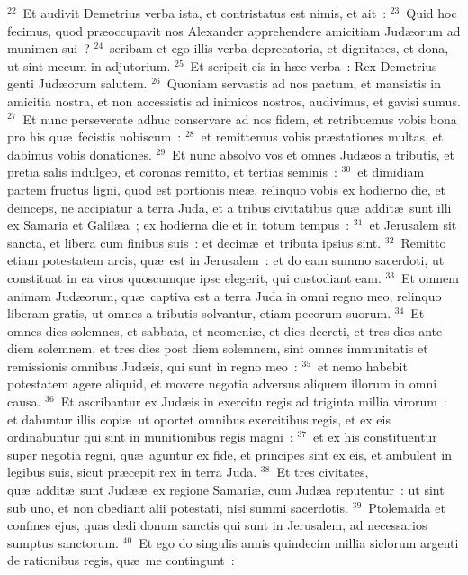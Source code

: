 ${}^{22}$~Et audivit Demetrius verba ista, et contristatus est nimis, et ait~:
${}^{23}$~Quid hoc fecimus, quod pr\ae occupavit nos Alexander apprehendere amicitiam Jud\ae orum ad munimen sui~?
${}^{24}$~scribam et ego illis verba deprecatoria, et dignitates, et dona, ut sint mecum in adjutorium.
${}^{25}$~Et scripsit eis in h\ae c verba~: Rex Demetrius genti Jud\ae orum salutem.
${}^{26}$~Quoniam servastis ad nos pactum, et mansistis in amicitia nostra, et non accessistis ad inimicos nostros, audivimus, et gavisi sumus.
${}^{27}$~Et nunc perseverate adhuc conservare ad nos fidem, et retribuemus vobis bona pro his qu\ae\ fecistis nobiscum~:
${}^{28}$~et remittemus vobis pr\ae stationes multas, et dabimus vobis donationes.
${}^{29}$~Et nunc absolvo vos et omnes Jud\ae os a tributis, et pretia salis indulgeo, et coronas remitto, et tertias seminis~:
${}^{30}$~et dimidiam partem fructus ligni, quod est portionis me\ae , relinquo vobis ex hodierno die, et deinceps, ne accipiatur a terra Juda, et a tribus civitatibus qu\ae\ addit\ae\ sunt illi ex Samaria et Galil\ae a~; ex hodierna die et in totum tempus~:
${}^{31}$~et Jerusalem sit sancta, et libera cum finibus suis~: et decim\ae\ et tributa ipsius sint.
${}^{32}$~Remitto etiam potestatem arcis, qu\ae\ est in Jerusalem~: et do eam summo sacerdoti, ut constituat in ea viros quoscumque ipse elegerit, qui custodiant eam.
${}^{33}$~Et omnem animam Jud\ae orum, qu\ae\ captiva est a terra Juda in omni regno meo, relinquo liberam gratis, ut omnes a tributis solvantur, etiam pecorum suorum.
${}^{34}$~Et omnes dies solemnes, et sabbata, et neomeni\ae , et dies decreti, et tres dies ante diem solemnem, et tres dies post diem solemnem, sint omnes immunitatis et remissionis omnibus Jud\ae is, qui sunt in regno meo~:
${}^{35}$~et nemo habebit potestatem agere aliquid, et movere negotia adversus aliquem illorum in omni causa.
${}^{36}$~Et ascribantur ex Jud\ae is in exercitu regis ad triginta millia virorum~: et dabuntur illis copi\ae\ ut oportet omnibus exercitibus regis, et ex eis ordinabuntur qui sint in munitionibus regis magni~:
${}^{37}$~et ex his constituentur super negotia regni, qu\ae\ aguntur ex fide, et principes sint ex eis, et ambulent in legibus suis, sicut pr\ae cepit rex in terra Juda.
${}^{38}$~Et tres civitates, qu\ae\ addit\ae\ sunt Jud\ae \ae\ ex regione Samari\ae , cum Jud\ae a reputentur~: ut sint sub uno, et non obediant alii potestati, nisi summi sacerdotis.
${}^{39}$~Ptolemaida et confines ejus, quas dedi donum sanctis qui sunt in Jerusalem, ad necessarios sumptus sanctorum.
${}^{40}$~Et ego do singulis annis quindecim millia siclorum argenti de rationibus regis, qu\ae\ me contingunt~:
